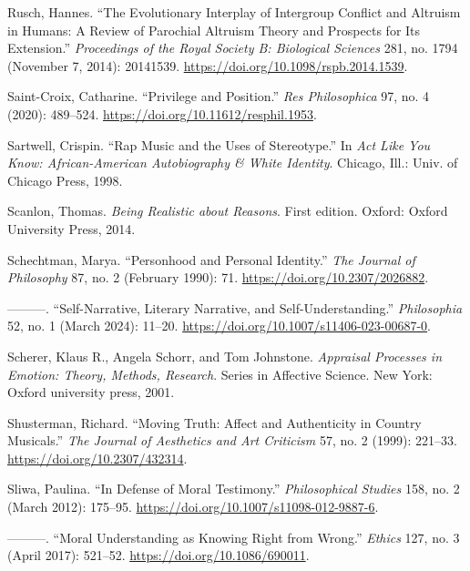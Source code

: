 \documentclass[phdthesis,12pt,final]{wuthesis}
\newlength{\cslhangindent}
\newenvironment{CSLReferences}[2] %
{\begin{list}{}{%
	\setlength{\itemindent}{0pt}
	\setlength{\leftmargin}{0pt}
	\setlength{\parsep}{0pt}
	\ifodd #1
	\setlength{\leftmargin}{\cslhangindent}
	\setlength{\itemindent}{-1\cslhangindent}
	\fi
	\setlength{\itemsep}{#2\baselineskip}}}
{\end{list}}
\theoremstyle{definition}
\theoremstyle{definition}
\theoremstyle{definition}
\theoremstyle{definition}
\theoremstyle{remark}
\begin{document}
\begin{CSLReferences}{1}{0}
Rusch, Hannes. {``The Evolutionary Interplay of Intergroup Conflict and Altruism in Humans: A Review of Parochial Altruism Theory and Prospects for Its Extension.''} \emph{Proceedings of the Royal Society B: Biological Sciences} 281, no. 1794 (November 7, 2014): 20141539. \url{https://doi.org/10.1098/rspb.2014.1539}.

Saint-Croix, Catharine. {``Privilege and {Position}.''} \emph{Res Philosophica} 97, no. 4 (2020): 489--524. \url{https://doi.org/10.11612/resphil.1953}.

Sartwell, Crispin. {``Rap {Music} and the {Uses} of {Stereotype}.''} In \emph{Act Like You Know: {African-American} Autobiography \& White Identity}. Chicago, Ill.: Univ. of Chicago Press, 1998.

Scanlon, Thomas. \emph{Being Realistic about Reasons}. First edition. Oxford: Oxford University Press, 2014.

Schechtman, Marya. {``Personhood and {Personal Identity}.''} \emph{The Journal of Philosophy} 87, no. 2 (February 1990): 71. \url{https://doi.org/10.2307/2026882}.

---------. {``Self-{Narrative}, {Literary Narrative}, and {Self-Understanding}.''} \emph{Philosophia} 52, no. 1 (March 2024): 11--20. \url{https://doi.org/10.1007/s11406-023-00687-0}.

Scherer, Klaus R., Angela Schorr, and Tom Johnstone. \emph{Appraisal Processes in Emotion: Theory, Methods, Research}. Series in Affective Science. New York: Oxford university press, 2001.

Shusterman, Richard. {``Moving {Truth}: {Affect} and {Authenticity} in {Country Musicals}.''} \emph{The Journal of Aesthetics and Art Criticism} 57, no. 2 (1999): 221--33. \url{https://doi.org/10.2307/432314}.

Sliwa, Paulina. {``In Defense of Moral Testimony.''} \emph{Philosophical Studies} 158, no. 2 (March 2012): 175--95. \url{https://doi.org/10.1007/s11098-012-9887-6}.

---------. {``Moral {Understanding} as {Knowing Right} from {Wrong}.''} \emph{Ethics} 127, no. 3 (April 2017): 521--52. \url{https://doi.org/10.1086/690011}.


\end{CSLReferences}
\end{document}
